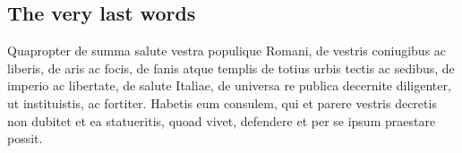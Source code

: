 \documentclass[12pt, a4paper, twoside]{article}
\begin{document}
	\subsection{The very last words}
	Quapropter de summa salute
	vestra populique Romani, de vestris coniugibus ac liberis, de aris ac
	focis, de fanis atque templis de totius urbis tectis ac sedibus, de
	imperio ac libertate, de salute Italiae, de universa re publica
	decernite diligenter, ut instituistis, ac fortiter. Habetis eum
	consulem, qui et parere vestris decretis non dubitet et ea %
	statueritis, quoad vivet, defendere et per se ipsum praestare possit.
	
	

	
	
\end{document}
